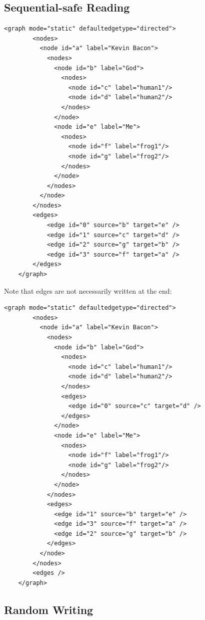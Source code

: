 \documentclass[a4paper,10pt]{article}
\begin{document}
\subsection{Sequential-safe Reading}

\lstset{ style=gexf }
\begin{lstlisting}[caption={First way},label=hierarchy1]
    <graph mode="static" defaultedgetype="directed">
        <nodes>
          <node id="a" label="Kevin Bacon">
            <nodes>
              <node id="b" label="God">
                <nodes>
                  <node id="c" label="human1"/>
                  <node id="d" label="human2"/>
                </nodes>
              </node>
              <node id="e" label="Me">
                <nodes>
                  <node id="f" label="frog1"/>
                  <node id="g" label="frog2"/>
                </nodes>
              </node>
            </nodes>
          </node>
        </nodes>
        <edges>
            <edge id="0" source="b" target="e" />
            <edge id="1" source="c" target="d" />
            <edge id="2" source="g" target="b" />
            <edge id="3" source="f" target="a" />
        </edges>
    </graph>
\end{lstlisting}

Note that edges are not necessarily written at the end:
\lstset{ style=gexf }
\begin{lstlisting}[caption={First way with edges inside clusters},label=hierarchy11]
    <graph mode="static" defaultedgetype="directed">
        <nodes>
          <node id="a" label="Kevin Bacon">
            <nodes>
              <node id="b" label="God">
                <nodes>
                  <node id="c" label="human1"/>
                  <node id="d" label="human2"/>
                </nodes>
                <edges>
                  <edge id="0" source="c" target="d" />
                </edges>
              </node>
              <node id="e" label="Me">
                <nodes>
                  <node id="f" label="frog1"/>
                  <node id="g" label="frog2"/>
                </nodes>
              </node>
            </nodes>
            <edges>
              <edge id="1" source="b" target="e" />
              <edge id="3" source="f" target="a" />
              <edge id="2" source="g" target="b" />
            </edges>
          </node>
        </nodes>
        <edges />
    </graph>
\end{lstlisting}

\subsection{Random Writing}
\end{document}
